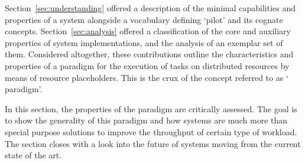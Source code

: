 \documentclass{sig-alternate}
\begin{document}

Section~\ref{sec:understanding} offered a description of the minimal
capabilities and properties of a \pilot system alongside a vocabulary defining
`pilot' and its cognate concepts. Section~\ref{sec:analysis} offered a
classification of the core and auxiliary properties of \pilot system
implementations, and the analysis of an exemplar set of them. Considered
altogether, these contributions outline the characteristics and properties of a
paradigm for the execution of tasks on distributed resources by means of
resource placeholders. This is the crux of the concept referred to as `\pilot
paradigm'.

In this section, the properties of the \pilot paradigm are critically assessed.
The goal is to show the generality of this paradigm and how \pilot systems
are much more than special purpose solutions to
improve the throughput of certain type of workload. The section closes with a
look into the future of \pilot systems moving from the current state of the art.




\end{document}
